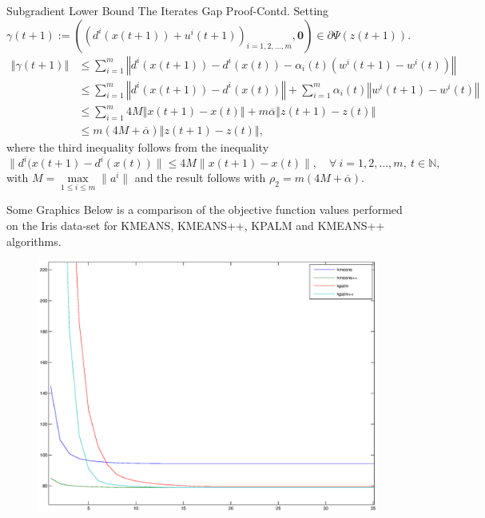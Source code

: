 \documentclass[9pt,handout]{beamer} %
\newcommand{\nn}{\mathbb{N}} %
\newcommand{\norm}[1]{\left\Vert {#1} \right\Vert} %
\begin{document}
	\begin{frame}{Subgradient Lower Bound The Iterates Gap Proof-Contd.}
		Setting $\gamma(t+1) := \left( \left( d^i(x(t+1)) + u^i(t+1) \right)_{i=1,2, \ldots ,m}, \mathbf{0} \right) \in \partial \Psi(z(t+1)).$
		\begin{align*}
			\norm{\gamma(t+1)}
				& \leq \sum\limits_{i=1}^{m} \norm{ d^i(x(t+1)) - d^i(x(t)) - \alpha_i(t) \left( w^i(t+1) - w^i(t) \right) } \\
				& \leq \sum\limits_{i=1}^{m} \norm{ d^i(x(t+1)) - d^i(x(t)) } + \sum\limits_{i=1}^{m} \alpha_i(t) \norm{ w^i(t+1) - w^i(t) } \\
				& \leq \sum\limits_{i=1}^{m} 4M \norm{ x(t+1) - x(t) } + m \overline{\alpha} \norm{ z(t+1) - z(t)} \\
				& \leq m \left( 4M + \overline{\alpha} \right) \norm{ z(t+1) - z(t)} , 
		\end{align*}
		where the third inequality follows from the inequality
		\begin{equation*}
			\| d^i(x(t+1) - d^i(x(t)) \| \leq 4M \| x(t+1) - x(t)\|, \quad \forall \: i=1, 2, \ldots ,m, \: t \in \nn,
		\end{equation*}
		with $M = \max\limits_{1 \leq i \leq m} \|a^i\|$ 
		and the result follows with $\rho_2 = m \left( 4M + \overline{\alpha} \right)$.
	\end{frame}
	
	\begin{frame}{Some Graphics}
		Below is a comparison of the objective function values performed on the Iris data-set for KMEANS, KMEANS++, KPALM and KMEANS++ algorithms.
		\begin{figure}[ht]
    		\centering
        	\includegraphics[width=0.95 \textwidth]{psi_algs_comparison2_zoom}
		\end{figure}
	\end{frame}
	
\end{document}
